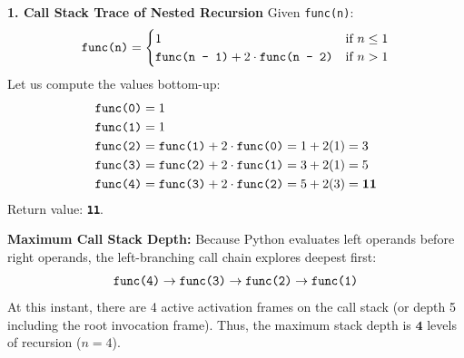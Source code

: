 \textbf{1. Call Stack Trace of Nested Recursion}
Given \texttt{func(n)}:
\begin{equation*}
\text{\texttt{func(n)}} = \begin{cases} 1 & \text{if } n \le 1 \\ \text{\texttt{func(n - 1)}} + 2 \cdot \text{\texttt{func(n - 2)}} & \text{if } n > 1 \end{cases}
\end{equation*}
Let us compute the values bottom-up:
\begin{align*}
\text{\texttt{func(0)}} &= 1 \\
\text{\texttt{func(1)}} &= 1 \\
\text{\texttt{func(2)}} &= \text{\texttt{func(1)}} + 2 \cdot \text{\texttt{func(0)}} = 1 + 2(1) = 3 \\
\text{\texttt{func(3)}} &= \text{\texttt{func(2)}} + 2 \cdot \text{\texttt{func(1)}} = 3 + 2(1) = 5 \\
\text{\texttt{func(4)}} &= \text{\texttt{func(3)}} + 2 \cdot \text{\texttt{func(2)}} = 5 + 2(3) = \mathbf{11}
\end{align*}
Return value: \textbf{\texttt{11}}.

\textbf{Maximum Call Stack Depth:}
Because Python evaluates left operands before right operands, the left-branching call chain explores deepest first:
\begin{equation*}
\text{\texttt{func(4)}} \to \text{\texttt{func(3)}} \to \text{\texttt{func(2)}} \to \text{\texttt{func(1)}}
\end{equation*}
At this instant, there are 4 active activation frames on the call stack (or depth 5 including the root invocation frame).
Thus, the maximum stack depth is $\mathbf{4}$ levels of recursion ($n = 4$).

